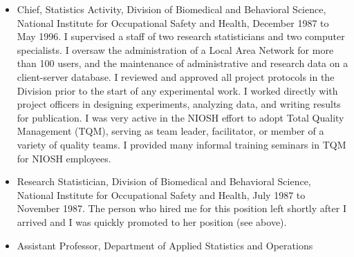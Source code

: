 \documentclass[
  12pt,
]{article}
\begin{document}
\begin{itemize}
  included a series of training classes that helped researchers to
  become self-sufficient for some of their less complex data analyses. I
  wrote some informational handouts for clients and placed these on my
  web (now at www.pmean.com). It started slowly, but averaging one or
  two handouts per week, I now have a website that has over 2,000 pages.
  This website is regularly cited in both paper and electronic resources
  for research methodology and pops up high on the list of search
  engines when technical terms in research are entered. I helped many
  researchers get funding (both internal and external) through research
  grants. I worked closely with the Institutional Review Board to ensure
  that protocols submitted to them addressed concerns about scientific
  merit and protection of confidentiality. I provided training in the
  ethical conduct of research. I worked closely with the effort to
  implement Evidence Based Health Care at CMH and participated in
  numerous journal clubs. In 2006, I published a book on the statistical
  issues associated with critical appraisal of research evidence. I was
  the sole statistician at CMH from 1996 to 2007 and oversaw a massive
  expansion in the quantity and quality of research conducted there.
\item
  Chief, Statistics Activity, Division of Biomedical and Behavioral
  Science, National Institute for Occupational Safety and Health,
  December 1987 to May 1996. I supervised a staff of two research
  statisticians and two computer specialists. I oversaw the
  administration of a Local Area Network for more than 100 users, and
  the maintenance of administrative and research data on a client-server
  database. I reviewed and approved all project protocols in the
  Division prior to the start of any experimental work. I worked
  directly with project officers in designing experiments, analyzing
  data, and writing results for publication. I was very active in the
  NIOSH effort to adopt Total Quality Management (TQM), serving as team
  leader, facilitator, or member of a variety of quality teams. I
  provided many informal training seminars in TQM for NIOSH employees.
\item
  Research Statistician, Division of Biomedical and Behavioral Science,
  National Institute for Occupational Safety and Health, July 1987 to
  November 1987. The person who hired me for this position left shortly
  after I arrived and I was quickly promoted to her position (see
  above).
\item
  Assistant Professor, Department of Applied Statistics and Operations

\end{itemize}
\end{document}
